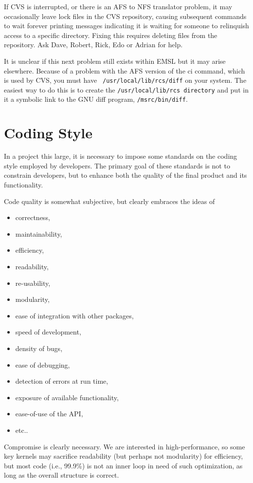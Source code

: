 If CVS is interrupted, or there is an AFS to NFS translator problem,
it may occasionally leave lock files in the CVS repository, causing
subsequent commands to wait forever printing messages indicating it is
waiting for someone to relinquish access to a specific directory.
Fixing this requires deleting files from the repository.  Ask Dave,
Robert, Rick, Edo or Adrian for help.

It is unclear if this next problem still exists within EMSL but it may
arise elsewhere.  Because of a problem with the AFS version of the ci
command, which is used by CVS, you must have {\tt
  /usr/local/lib/rcs/diff} on your system.  The easiest way to do this
is to create the {\tt /usr/local/lib/rcs directory} and put in it a
symbolic link to the GNU diff program, {\tt /msrc/bin/diff}.


\section{Coding Style}
\label{sec:coding-style}

In a project this large, it is necessary to impose some standards on
the coding style employed by developers.  The primary goal of these
standards is not to constrain developers, but to enhance both the
quality of the final product and its functionality. 

Code quality is somewhat subjective, but clearly embraces the ideas of
\begin{itemize}
\item correctness, 
\item maintainability, 
\item efficiency, 
\item readability, 
\item re-usability, 
\item modularity, 
\item ease of integration with other packages,
\item speed of development, 
\item density of bugs, 
\item ease of debugging, 
\item detection of errors at run time,
\item exposure of available functionality,
\item ease-of-use of the API,
\item etc..
\end{itemize}
Compromise is clearly necessary. We are interested in
high-performance, so some key kernels may sacrifice readability (but
perhaps not modularity) for efficiency, but most code (i.e., 99.9\%)
is not an inner loop in need of such optimization, as long as the
overall structure is correct.

